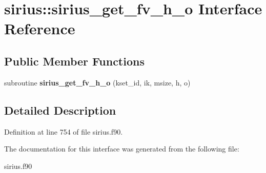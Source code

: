 \hypertarget{interfacesirius_1_1sirius__get__fv__h__o}{}\section{sirius\+:\+:sirius\+\_\+get\+\_\+fv\+\_\+h\+\_\+o Interface Reference}
\label{interfacesirius_1_1sirius__get__fv__h__o}
\subsection*{Public Member Functions}
\begin{DoxyCompactItemize}
\item 
\hypertarget{interfacesirius_1_1sirius__get__fv__h__o_a0e9d7bfe4fac50300d45ab701d96c590}{}subroutine {\bfseries sirius\+\_\+get\+\_\+fv\+\_\+h\+\_\+o} (kset\+\_\+id, ik, msize, h, o)\label{interfacesirius_1_1sirius__get__fv__h__o_a0e9d7bfe4fac50300d45ab701d96c590}

\end{DoxyCompactItemize}


\subsection{Detailed Description}


Definition at line 754 of file sirius.\+f90.



The documentation for this interface was generated from the following file\+:\begin{DoxyCompactItemize}
\item 
sirius.\+f90\end{DoxyCompactItemize}

